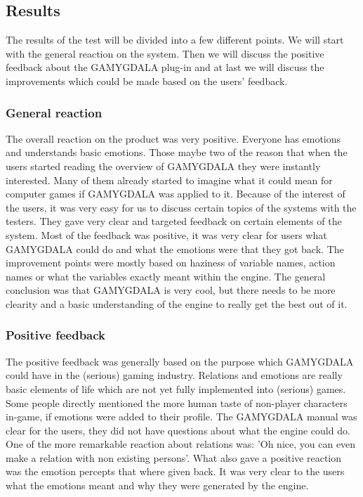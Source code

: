 \pagebreak

\subsection{Results}
The results of the test will be divided into a few different points. We will start with the general reaction on the system. Then we will discuss the positive feedback about the GAMYGDALA plug-in and at last we will discuss the improvements which could be made based on the users' feedback.

\subsubsection{General reaction}
The overall reaction on the product was very positive. Everyone has emotions and understands basic emotions. Those maybe two of the reason that when the users started reading the overview of GAMYGDALA they were instantly interested. Many of them already started to imagine what it could mean for computer games if GAMYGDALA was applied to it. Because of the interest of the users, it was very easy for us to discuss certain topics of the systems with the testers. They gave very clear and targeted feedback on certain elements of the system. Most of the feedback was positive, it was very clear for users what GAMYGDALA could do and what the emotions were that they got back. The improvement points were mostly based on haziness of variable names, action names or what the variables exactly meant within the engine. The general conclusion was that GAMYGDALA is very cool, but there needs to be more clearity and a basic understanding of the engine to really get the best out of it.

\subsubsection{Positive feedback}
The positive feedback was generally based on the purpose which GAMYGDALA could have in the (serious) gaming industry. Relations and emotions are really basic elements of life which are not yet fully implemented into (serious) games. Some people directly mentioned the more human taste of non-player characters in-game, if emotions were added to their profile. The GAMYGDALA manual was clear for the users, they did not have questions about what the engine could do. One of the more remarkable reaction about relations was: 'Oh nice, you can even make a relation with non existing persons'. What also gave a positive reaction was the emotion percepts that where given back. It was very clear to the users what the emotions meant and why they were generated by the engine.

